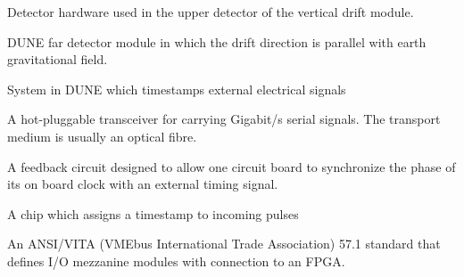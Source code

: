 

 {Detector hardware used in the upper detector of the vertical drift module.}

 {DUNE far detector module in which the drift direction is parallel with earth gravitational field.}


 {System in DUNE which timestamps external electrical signals}

 {A hot-pluggable transceiver for carrying Gigabit/s serial signals. The transport medium is usually an optical fibre.}




 {A feedback circuit designed to allow one circuit board to synchronize the phase of its on board clock with an external timing signal.}

 {A chip which assigns a timestamp to incoming pulses}

 {An ANSI/VITA (VMEbus International Trade Association) 57.1 standard that defines I/O mezzanine modules with connection to an FPGA.}



